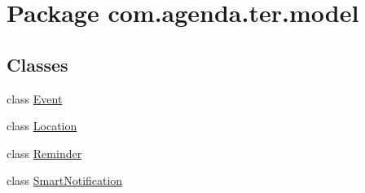 \hypertarget{namespacecom_1_1agenda_1_1ter_1_1model}{\section{Package com.\-agenda.\-ter.\-model}
\label{namespacecom_1_1agenda_1_1ter_1_1model}
}
\subsection*{Classes}
\begin{DoxyCompactItemize}
\item 
class \hyperlink{classcom_1_1agenda_1_1ter_1_1model_1_1_event}{Event}
\item 
class \hyperlink{classcom_1_1agenda_1_1ter_1_1model_1_1_location}{Location}
\item 
class \hyperlink{classcom_1_1agenda_1_1ter_1_1model_1_1_reminder}{Reminder}
\item 
class \hyperlink{classcom_1_1agenda_1_1ter_1_1model_1_1_smart_notification}{Smart\-Notification}
\end{DoxyCompactItemize}
